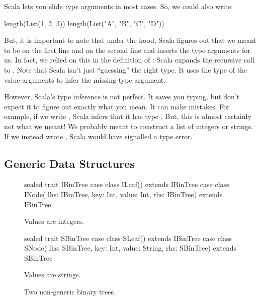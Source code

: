 \documentclass{book}
\begin{document}
Scala lets you elide type arguments in most cases. So, we could also write:
%
\begin{scalacode}
length(List(1, 2, 3))
length(List("A", "B", "C", "D"))
\end{scalacode}
%
But, it is important to note that under the hood, Scala figures out that we
meant  to be  on the first line and
 on the second line and inserts the type arguments for us.
In fact, we relied on this in the definition of : Scala
expands the recursive call  to
. Note that Scala isn't just ``guessing'' the
right type. It uses the type of the value-arguments to infer the missing
type argument.

However, Scala's type inference is not perfect. It saves you typing, but don't
expect it to figure out exactly what you mean. It can make mistakes.
For example, if we write , Scala infers
that it has type . But, this is almost certainly
not what we meant! We probably meant to construct a list of integers
or strings. If we instead wrote , Scala
would have signalled a type error.

\subsection{Generic Data Structures}

\begin{figure}

\begin{minipage}{0.45\textwidth}
\begin{scalacode}
sealed trait IBinTree
case class ILeaf() extends IBinTree
case class INode(
  lhs: IBinTree,
  key: Int,
  value: Int,
  rhs: IBinTree)
  extends IBinTree
\end{scalacode}
\caption{Values are integers.}
\end{minipage}
\quad\vrule\quad
\begin{minipage}{0.45\textwidth}
\begin{scalacode}
sealed trait SBinTree
case class SLeaf() extends IBinTree
case class SNode(
  lhs: SBinTree,
  key: Int,
  value: String,
  rhs: SBinTree)
  extends SBinTree
\end{scalacode}
\caption{Values are strings.}
\end{minipage}
\caption{Two non-generic binary trees.}
\label{monobintrees}
\end{figure}
\end{document}
